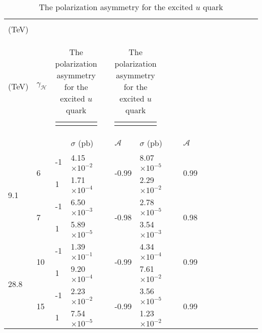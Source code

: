 \documentclass{appolb}
\begin{document}
\begin{table}[h!]
	\caption{\label{tab:asymmetry}  The polarization asymmetry for the excited $u$ quark} 
	\begin{tabular*}{\columnwidth}{@{\extracolsep{\fill}}llllllllllllll@{}}
		\hline 
		\begin{tabular}[c]{@{}c@{}}CM \\ (TeV)\end{tabular} & \begin{tabular}[c]{@{}c@{}}$M_{u^*}$ \\(TeV)\end{tabular} & $\gamma_{\mathcal{H}}$ & \multicolumn{2}{c|}{\begin{tabular}[c]{@{}c@{}} $\eta_{L} = 1, \eta_{R} = 0$ \end{tabular}}  & \multicolumn{2}{c}{\begin{tabular}[c]{@{}c@{}}$\eta_{L} = 0, \eta_{R} = 1$ \end{tabular}}\\ \hline
		& & &$\sigma$ (pb) & $\mathcal{A}$ &$\sigma$ (pb) & $\mathcal{A}$  \\ \hline
		\multirow{4}{*}{9.1} & \multirow{2}{*}{6} & -1 & 4.15$\times 10^{-2}$& \multirow{2}{*}{-0.99} & 8.07$\times 10^{-5}$  & \multirow{2}{*}{0.99} \\ \cline{3-4} \cline{6-6}
		&  & $\;\,$1 & 1.71$\times 10^{-4}$ &  &2.29$\times 10^{-2}$  &  \\  \cline{2-7} 
		& \multirow{2}{*}{7} & -1 & 6.50$\times 10^{-3}$  & \multirow{2}{*}{-0.98} & 2.78$\times 10^{-5}$ & \multirow{2}{*}{0.98} \\ \cline{3-4}\cline{6-6}
		&  & $\;\,$1 & 5.89$\times 10^{-5}$ &  &3.54$\times 10^{-3}$  &  \\ \hline
		\multirow{4}{*}{28.8} & \multirow{2}{*}{10} & -1 & 1.39$\times 10^{-1}$& \multirow{2}{*}{-0.99}  & 4.34$\times 10^{-4}$ & \multirow{2}{*}{0.99} \\ \cline{3-4} \cline{6-6}
		&  & $\;\,$1 & 9.20$\times 10^{-4}$ &  & 7.61$\times 10^{-2}$ &  \\ \cline{2-7} 
		& \multirow{2}{*}{15} & -1 & 2.23$\times 10^{-2}$ & \multirow{2}{*}{-0.99}& 3.56$\times 10^{-5}$  & \multirow{2}{*}{0.99} \\ \cline{3-4} \cline{6-6}
		&  & $\;\,$1 & 7.54$\times 10^{-5}$ &  &1.23$\times 10^{-2}$  &  \\ \hline 
	\end{tabular*}
\end{table}
\end{document}
